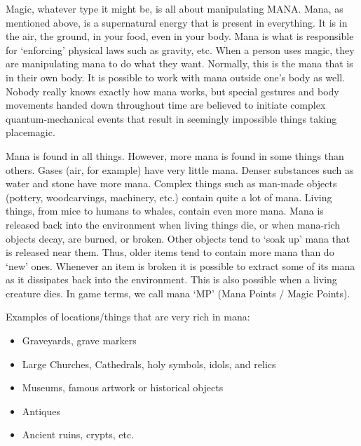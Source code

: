 \documentclass[twoside]{book}
\begin{document}
    {  
      Magic, whatever type it might be, is all about
             manipulating MANA. Mana, as mentioned above, is a
             supernatural energy that is present in everything. It is in
             the air, the ground, in your food, even in your body. Mana
             is what is responsible for `enforcing' physical
             laws such as gravity, etc. When a person uses magic, they
             are manipulating mana to do what they want. Normally, this
             is the mana that is in their own body. It is possible to
             work with mana outside one's body as well. Nobody
             really knows exactly how mana works, but special gestures
             and body movements handed down throughout time are believed
             to initiate complex quantum-mechanical events that result in
             seemingly impossible things taking placemagic.
             
    }
  
    {  
      Mana is found in all things. However, more mana is
             found in some things than others. Gases (air, for example)
             have very little mana. Denser substances such as water and
             stone have more mana. Complex things such as man-made
             objects (pottery, woodcarvings, machinery, etc.) contain
             quite a lot of mana. Living things, from mice to humans to
             whales, contain even more mana. Mana is released back into
             the environment when living things die, or when mana-rich
             objects decay, are burned, or broken. Other objects tend to
             `soak up' mana that is released near them. Thus,
             older items tend to contain more mana than do
             `new' ones. Whenever an item is broken it is
             possible to extract some of its mana as it dissipates back
             into the environment. This is also possible when a living
             creature dies. In game terms, we call mana `MP'
             (Mana Points / Magic Points). 
    }
  
    {  
      Examples of locations/things that are very rich in
             mana: 
    }
  
\begin{itemize}
      
  \item   Graveyards, grave markers 
  \item   Large Churches, Cathedrals, holy symbols, idols,
               and relics 
  \item   Museums, famous artwork or historical objects
               
  \item   Antiques 
  \item   Ancient ruins, crypts, etc. 
\end{itemize}
  
\end{document}
